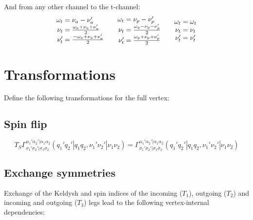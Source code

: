 \documentclass[12pt,a4paper,roman]{article}
\begin{document}
And from any other channel to the t-channel:
\begin{align}
    \begin{array}{r@{\mskip\thickmuskip}l}
    \omega_t &= \nu_a-\nu'_a\\
    \nu_t  &= \frac{ \omega_a+\nu_a+\nu'_a}{2}\\
    \nu'_t &= \frac{-\omega_a+\nu_a+\nu'_a}{2}\\
  \end{array}
  \quad  \begin{array}{r@{\mskip\thickmuskip}l}
    \omega_t &= \nu_p-\nu'_p\\
    \nu_t  &= \frac{\omega_p-\nu_p-\nu'_p}{2}\\
    \nu'_t &= \frac{\omega_p+\nu_p+\nu'_p}{2}\\
  \end{array} \quad
  \begin{array}{r@{\mskip\thickmuskip}l}
    \omega_t &= \omega_t\\
    \nu_t  &= \nu_t \\
    \nu'_t &= \nu'_t\\
  \end{array}
  \label{eq:TtoAll}
\end{align}





\section*{Transformations}
Define the following transformations for the full vertex:
\subsection*{Spin flip}
\begin{equation}
T_S \Gamma^{\alpha_1'\alpha_2'|\alpha_1\alpha_2}_{\sigma_1'\sigma_2'|\sigma_1\sigma_2} (q_1'q_2'|q_1q_2, \nu_1'\nu_2'|\nu_1\nu_2) = \Gamma^{\alpha_1'\alpha_2'|\alpha_1\alpha_2}_{\bar{\sigma}_1'\bar{\sigma}_2'|\bar{\sigma}_1\bar{\sigma}_2} (q_1'q_2'|q_1q_2, \nu_1'\nu_2'|\nu_1\nu_2)
\end{equation}

\subsection*{Exchange symmetries}
Exchange of the Keldysh and spin indices of the incoming ($T_1$), outgoing ($T_2$) and incoming and outgoing ($T_3$) legs lead to the following vertex-internal dependencies:
\end{document}

